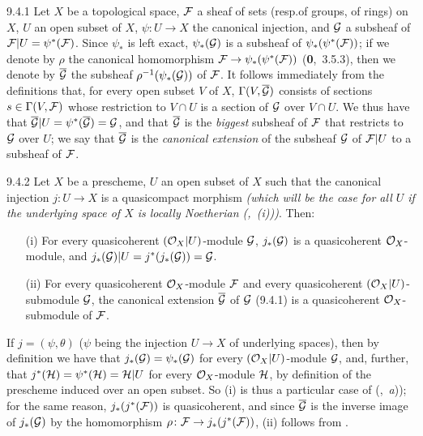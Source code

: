 
\begin{env}{9.4.1}
Let $X$ be a topological space, $\mathcal{F}$ a
sheaf of sets (resp.of groups, of rings) on $X$, $U$ an open subset of $X$,
$\psi\colon U\to X$ the canonical injection, and $\mathcal{G}$ a subsheaf of
$\mathcal{F}|U=\psi^\ast(\mathcal{F})$. Since $\psi_\ast$ is left exact,
$\psi_\ast(\mathcal{G})$ is a subsheaf of $\psi_\ast(\psi^\ast(\mathcal{F}))$; if we denote
by $\rho$ the canonical homomorphism $\mathcal{F}\to\psi_\ast(\psi^\ast(\mathcal{F}))$
(\textbf{0},~3.5.3), then we denote by $\overline{\mathcal{G}}$ the subsheaf
$\rho^{-1}(\psi_\ast(\mathcal{G}))$ of $\mathcal{F}$. It follows immediately from the
definitions that, for every open subset $V$ of $X$,
$\Gamma(V,\overline{\mathcal{G}})$ consists of sections $s\in\Gamma(V,\mathcal{F})$
whose restriction to $V\cap U$ is a section of $\mathcal{G}$ over $V\cap U$. We
thus have that $\overline{\mathcal{G}}|U=\psi^\ast(\overline{\mathcal{G}})=\mathcal{G}$,
and that $\overline{\mathcal{G}}$ is the \emph{biggest} subsheaf of $\mathcal{F}$
that restricts to $\mathcal{G}$ over $U$; we say that $\overline{\mathcal{G}}$ is
the \emph{canonical extension} of the subsheaf $\mathcal{G}$ of $\mathcal{F}|U$ to a
subsheaf of $\mathcal{F}$.
\end{env}

\begin{env}[Proposition]{9.4.2}
Let $X$ be a prescheme, $U$ an open subset of $X$ such that the canonical injection
$j\colon U\to X$ is a quasicompact morphism \emph{(which will be the case for
\emph{all} $U$ if the underlying space of $X$ is \emph{locally Noetherian}
{\normalfont(,~(i))})}. Then:
\begin{itemize}
  \item[(i)] For every quasicoherent $(\mathcal{O}_X|U)$-module $\mathcal{G}$, $j_\ast(\mathcal{G})$
             is a quasicoherent $\mathcal{O}_X$-module, and
             $j_\ast(\mathcal{G})|U=j^\ast(j_\ast(\mathcal{G}))=\mathcal{G}$.
  \item[(ii)] For every quasicoherent $\mathcal{O}_X$-module $\mathcal{F}$ and every quasicoherent
              $(\mathcal{O}_X|U)$-submodule $\mathcal{G}$, the canonical extension
              $\overline{\mathcal{G}}$ of $\mathcal{G}$ {\normalfont(9.4.1)} is a
              quasicoherent $\mathcal{O}_X$-submodule of $\mathcal{F}$.
\end{itemize}
\end{env}

If $j=(\psi,\theta)$ ($\psi$ being the injection $U\to X$ of underlying spaces),
then by definition we have that $j_\ast(\mathcal{G})=\psi_\ast(\mathcal{G})$ for every
$(\mathcal{O}_X|U)$-module $\mathcal{G}$, and, further, that
$j^\ast(\mathcal{H})=\psi^\ast(\mathcal{H})=\mathcal{H}|U$ for every $\mathcal{O}_X$-module
$\mathcal{H}$, by definition of the prescheme induced over an open subset. So (i)
is thus a particular case of (,~\emph{a})); for the same reason,
$j_\ast(j^\ast(\mathcal{F}))$ is quasicoherent, and since $\overline{\mathcal{G}}$ is the
inverse image of $j_\ast(\mathcal{G})$ by the homomorphism $\rho\colon\mathcal{F}\to
j_\ast(j^\ast(\mathcal{F}))$, (ii) follows from .
 
